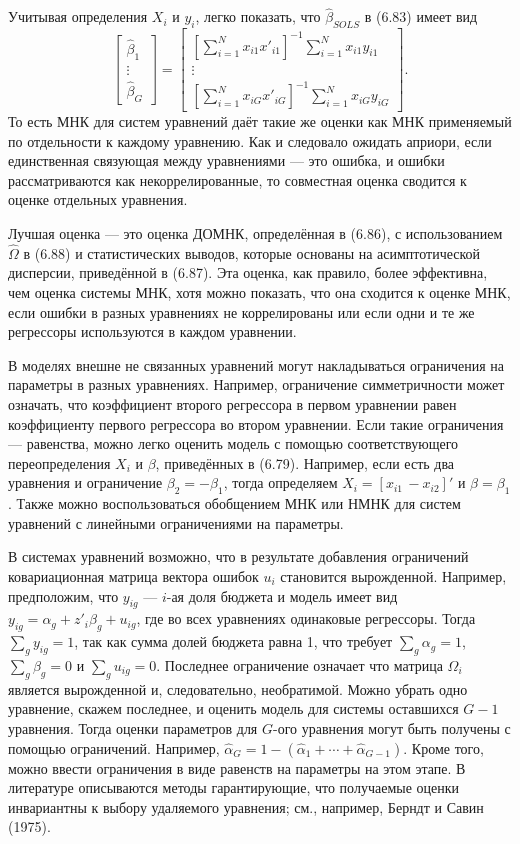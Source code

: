 Учитывая определения $X_i$ и $y_i$, легко показать, что $\hat{\beta}_{SOLS}$ в (6.83) имеет вид
\[
\begin{bmatrix} \hat{\beta}_1 \\ \vdots \\ \hat{\beta}_G \end{bmatrix} = \begin{bmatrix} \left[ \sum_{i=1}^N x_{i1} x'_{i1} \right]^{-1} \sum_{i=1}^N x_{i1} y_{i1} \\ \vdots \\ \left[ \sum_{i=1}^N x_{iG} x'_{iG} \right]^{-1} \sum_{i=1}^N x_{iG} y_{iG} \end{bmatrix}.
\]
То есть МНК для систем уравнений даёт такие же оценки как МНК применяемый по отдельности к каждому уравнению.  Как и следовало ожидать априори, если единственная связующая между уравнениями --- это ошибка, и ошибки рассматриваются как некоррелированные, то совместная оценка сводится к оценке отдельных уравнения.

Лучшая оценка --- это оценка ДОМНК, определённая в (6.86), с использованием $\hat{\Omega}$ в (6.88) и статистических выводов, которые основаны на асимптотической дисперсии, приведённой в (6.87). Эта оценка, как правило, более эффективна, чем оценка системы МНК, хотя можно показать, что она сходится к оценке МНК, если ошибки в разных  уравнениях не коррелированы или если одни и те же регрессоры используются в каждом уравнении.

В моделях внешне не связанных уравнений могут накладываться ограничения на параметры в разных уравнениях. Например, ограничение симметричности может означать, что коэффициент второго регрессора в первом уравнении равен коэффициенту первого регрессора во втором уравнении. Если такие ограничения --- равенства, можно легко оценить модель с помощью соответствующего переопределения $X_i$ и $\beta$, приведённых в (6.79). Например, если есть два уравнения и ограничение $\beta_2=-\beta_1$, тогда определяем $X_i=[x_{i1} \, -x_{i2}]'$ и $\beta=\beta_1$. Также можно воспользоваться обобщением МНК или НМНК для систем уравнений с линейными ограничениями на параметры.

В системах уравнений возможно, что в результате добавления ограничений ковариационная матрица вектора ошибок $u_i$ становится вырожденной. Например, предположим, что $y_{ig}$ --- $i$-ая доля бюджета и модель имеет вид $y_{ig}= \alpha_g + z'_i \beta_g + u_{ig}$, где во всех уравнениях одинаковые регрессоры. Тогда $\sum_g y_{ig}=1$, так как сумма долей бюджета равна 1, что требует $\sum_g \alpha_{g}=1$, $\sum_g \beta_{g}=0$ и $\sum_g u_{ig}=0$. Последнее ограничение означает что матрица $\Omega_i$ является вырожденной и, следовательно, необратимой. Можно убрать одно уравнение, скажем последнее, и оценить модель для системы оставшихся $G-1$ уравнения. Тогда оценки параметров для $G$-ого уравнения могут быть получены с помощью ограничений. Например, $\hat{\alpha}_G=1-(\hat{\alpha}_1 + \cdots + \hat{\alpha}_{G-1})$. Кроме того, можно ввести ограничения в виде равенств на параметры на этом этапе. В литературе описываются методы гарантирующие, что получаемые оценки инвариантны к выбору удаляемого уравнения; см., например, Берндт и Савин (1975).

